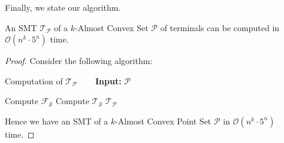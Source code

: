 Finally, we state our algorithm.

\begin{theorem}
\label{final_theorem}

An SMT $\mathcal T_{\mathcal P}$ of a $k$-Almost Convex Set $\mathcal P$ of terminals can be computed in $\mathcal O(n^k \cdot 5^n)$ time.

\end{theorem}

\begin{proof}

Consider the following algorithm: 
\begin{algorithm}[H]
\caption{Computation of $\mathcal{T_P}$ ~~~ \textbf{Input:} $\mathcal P$ }\label{alg:main algo}
\begin{algorithmic}[1]
\State Compute $\mathcal {F_S}$ 
\EndFor {}
\State Compute $\mathcal {T_S}$ 
\EndFor {}
\State \Return $\mathcal{T_P}$ 
\end{algorithmic}
\end{algorithm}



Hence we have an SMT of a $k$-Almost Convex Point Set $\mathcal P$ in $\mathcal O(n^k\cdot 5^n)$ time.


\end{proof}


